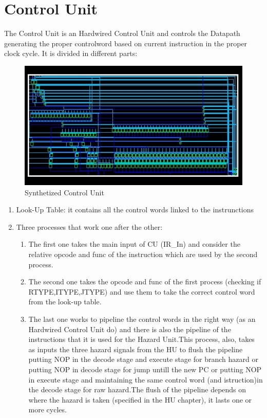 \chapter{Control Unit}
\label{Control Unit}
The Control Unit is an Hardwired Control Unit and controls the Datapath generating the proper controlword based on current instruction in the proper clock cycle. It is divided in different parts:

\begin{figure}[h!]
	\centering
	\includegraphics[width=\textwidth]{chapters/figures/ControlUnit_highlevel.jpg} 
	\caption{Synthetized Control Unit}
	\label{fig:cu}  %
	\end{figure}

\begin{enumerate} 
    \item Look-Up Table: it contains all the control words linked to the instrunctions
    \item Three processes that work one after the other:
    \begin{enumerate}
    \item The first one takes the main input of CU (IR\_In) and consider the relative opcode and func of the instruction which are used by the second process.
    \item The second one takes the opcode and func of the first process (checking if RTYPE,ITYPE,JTYPE) and use them to take the correct control word from the look-up table.
    \item The last one works to pipeline the control words in the right way (as an Hardwired Control Unit do) and there is also the pipeline of the instructions that it is used for the Hazard Unit.This process, also, takes as inputs the three hazard signals from the HU to flush the pipeline putting NOP in the decode stage and execute stage for branch hazard or putting NOP in decode stage for jump untill the new PC or putting NOP in execute stage and maintaining the same control word (and istruction)in the decode stage for raw hazard.The flush of the pipeline depends on where the hazard is taken (specified in the HU chapter), it lasts one or more cycles. 
    \end{enumerate}
\end{enumerate}
